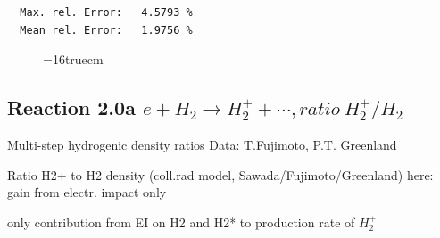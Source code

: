 \documentclass[12pt,dvips]{article}
\begin{document}
\begin{small}
\begin{verbatim}
  Max. rel. Error:   4.5793 %
  Mean rel. Error:   1.9756 %

\end{verbatim}\end{small}
\begin{figure} \label{7.2e}
\epsfxsize=16truecm
\end{figure}
\newpage

\subsection{
Reaction 2.0a  $e + H_2 \rightarrow H_2^+ + \cdots , ratio \ H_2^+/H_2$
}

 Multi-step hydrogenic density ratios
 Data: T.Fujimoto, P.T. Greenland


  Ratio H2+ to H2 density
  (coll.rad model, Sawada/Fujimoto/Greenland)
 here:  gain from electr. impact only

  only contribution from  EI on H2 and H2* to production rate of $H_2^+$
\end{document}

